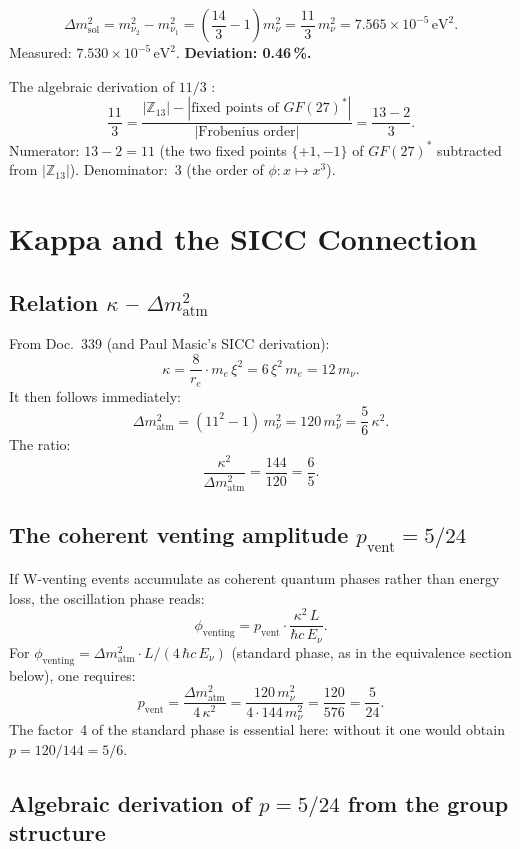 \[
\Delta m^2_\text{sol}=m_{\nu_2}^2-m_{\nu_1}^2
=\left(\frac{14}{3}-1\right)m_\nu^2=\frac{11}{3}\,m_\nu^2
=7.565\times10^{-5}\,\text{eV}^2.
\]
Measured: $7.530\times10^{-5}\,\text{eV}^2$. \textbf{Deviation: 0.46\,\%.}

The algebraic derivation of $11/3$ \BM:
\[
\frac{11}{3}
=\frac{|\mathbb{Z}_{13}|-|\text{fixed points of }GF(27)^*|}{|\text{Frobenius order}|}
=\frac{13-2}{3}.
\]
Numerator: $13-2=11$ (the two fixed points $\{+1,-1\}$ of $GF(27)^*$
subtracted from $|\mathbb{Z}_{13}|$). Denominator:~3 (the order of
$\phi:x\mapsto x^3$).

\section{Kappa and the SICC Connection \KM}

\subsection{Relation $\kappa$ -- $\Delta m^2_\text{atm}$}

From Doc.~339 (and Paul Masic's SICC derivation):
\[
\kappa=\frac{8}{r_e}\cdot m_e\,\xi^2=6\,\xi^2\,m_e=12\,m_\nu.
\]
It then follows immediately:
\[
\Delta m^2_\text{atm}=(11^2-1)\,m_\nu^2=120\,m_\nu^2
=\frac{5}{6}\,\kappa^2.
\]
The ratio:
\[
\frac{\kappa^2}{\Delta m^2_\text{atm}}=\frac{144}{120}=\frac{6}{5}.
\]

\subsection{The coherent venting amplitude $p_\text{vent}=5/24$ \BM}

If W-venting events accumulate as coherent quantum phases rather than
energy loss, the oscillation phase reads:
\[
\phi_\text{venting}=p_\text{vent}\cdot\frac{\kappa^2\,L}{\hbar c\,E_\nu}.
\]
For $\phi_\text{venting}=\Delta m^2_\text{atm}\cdot L/(4\,\hbar c\,E_\nu)$
(standard phase, as in the equivalence section below),
one requires:
\[
p_\text{vent}=\frac{\Delta m^2_\text{atm}}{4\,\kappa^2}
=\frac{120\,m_\nu^2}{4\cdot144\,m_\nu^2}=\frac{120}{576}=\frac{5}{24}.
\]
The factor~4 of the standard phase is essential here: without it one would
obtain $p=120/144=5/6$.

\subsection{Algebraic derivation of $p=5/24$ from the group structure \BM}

